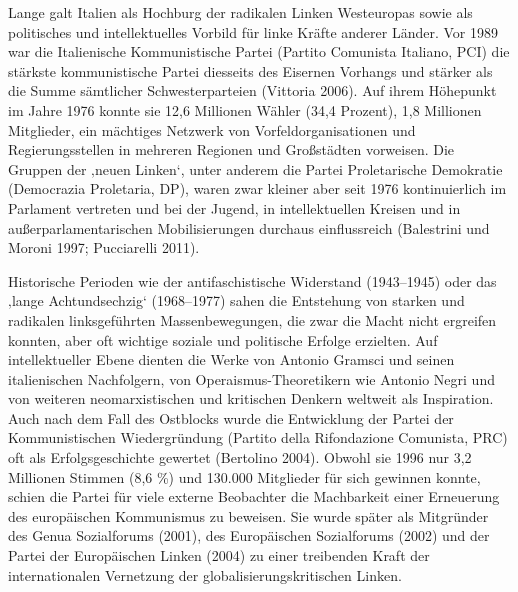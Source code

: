 
\begin{multicols*}{2}

\noindent Lange galt Italien als Hochburg der radikalen Linken Westeuropas sowie als politisches und intellektuelles Vorbild für linke Kräfte anderer Länder. Vor 1989 war die Italienische Kommunistische Partei (Partito Comunista Italiano, PCI) die stärkste kommunistische Partei diesseits des Eisernen Vorhangs und stärker als die Summe sämtlicher Schwesterparteien (Vittoria 2006). Auf ihrem Höhepunkt im Jahre 1976 konnte sie 12,6 Millionen Wähler (34,4 Prozent), 1,8 Millionen Mitglieder, ein mächtiges Netzwerk von Vorfeldorganisationen und Regierungsstellen in mehreren Regionen und Großstädten vorweisen. Die Gruppen der ‚neuen Linken‘, unter anderem die Partei Proletarische Demokratie (Democrazia Proletaria, DP), waren zwar kleiner aber seit 1976 kontinuierlich im Parlament vertreten und bei der Jugend, in intellektuellen Kreisen und in außerparlamentarischen Mobilisierungen durchaus einflussreich (Balestrini und Moroni 1997; Pucciarelli 2011). 

Historische Perioden wie der antifaschistische Widerstand (1943–1945) oder das ‚lange Achtundsechzig‘ (1968–1977) sahen die Entstehung von starken und radikalen linksgeführten Massenbewegungen, die zwar die Macht nicht ergreifen konnten, aber oft wichtige soziale und politische Erfolge erzielten. Auf intellektueller Ebene dienten die Werke von Antonio Gramsci und seinen italienischen Nachfolgern, von Operaismus-Theoretikern wie Antonio Negri und von weiteren neomarxistischen und kritischen Denkern weltweit als Inspiration. Auch nach dem Fall des Ostblocks wurde die Entwicklung der Partei der Kommunistischen Wiedergründung (Partito della Rifondazione Comunista, PRC) oft als Erfolgsgeschichte gewertet (Bertolino 2004). Obwohl sie 1996 nur 3,2 Millionen Stimmen (8,6 \%) und 130.000 Mitglieder für sich gewinnen konnte, schien die Partei für viele externe Beobachter die Machbarkeit einer Erneuerung des europäischen Kommunismus zu beweisen. Sie wurde später als Mitgründer des Genua Sozialforums (2001), des Europäischen Sozialforums (2002) und der Partei der Europäischen Linken (2004) zu einer treibenden Kraft der internationalen Vernetzung der globalisierungskritischen Linken.


\end{multicols*}
